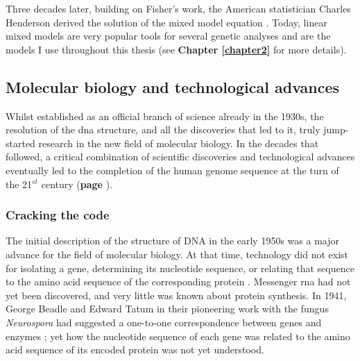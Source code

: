 Three decades later, building on Fisher’s work, the American statistician Charles Henderson derived the solution of the mixed model equation \cite{henderson1950estimation}. 
Today, linear mixed models are very popular tools for several genetic analyses and are the models I use throughout this thesis (see \textbf{Chapter
\ref{chapter2}} for more details).

\newpage

\subsection{Molecular biology and technological advances}
\label{sec:genetic_timeline}

Whilst established as an official branch of science already in the 1930s, the resolution of the \gls{dna} structure, and all the discoveries that led to it, truly jump-started research in the new field of molecular biology.
In the decades that followed, a critical combination of scientific discoveries and technological advances eventually led to the completion of the human genome sequence at the turn of the 21$^{st}$ century \cite{nhgri2003genetic} (\textbf{page \pageref{sec:hgp}}).

\subsubsection{Cracking the code}
\label{sec:genetic_code}

The initial description of the structure of DNA in the early 1950s was a major advance for the field of molecular biology. 
At that time, technology did not exist for isolating a gene, determining its nucleotide sequence, or relating that sequence to the amino acid sequence of the corresponding protein \cite{yanofsky2007establishing}. 
Messenger \gls{rna} had not yet been discovered, and very little was known about protein synthesis. 
In 1941, George Beadle and Edward Tatum in their pioneering work with the fungus \textit{Neurospora} had suggested a one-to-one correspondence between genes and enzymes \cite{beadle1941genetic}; 
yet how the nucleotide sequence of each gene was related to the amino acid sequence of its encoded protein was not yet understood.\\

